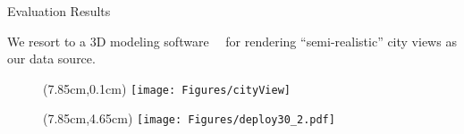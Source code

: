 \begin{frame}{Evaluation Results}
\begin{itemize}
	\myItem We resort to a 3D modeling software~~ for rendering ``semi-realistic'' city views as our data source.
\end{itemize}
% 
\begin{figure}
\centering
\begin{textblock*}{1cm}(7.85cm,0.1cm) %
\texttt{[image: Figures/cityView]}
\end{textblock*}
\end{figure}
%
\begin{figure}
\centering
\begin{textblock*}{1cm}(7.85cm,4.65cm) %
\texttt{[image: Figures/deploy30\_2.pdf]}
\end{textblock*}
\end{figure}
%
\end{frame}
